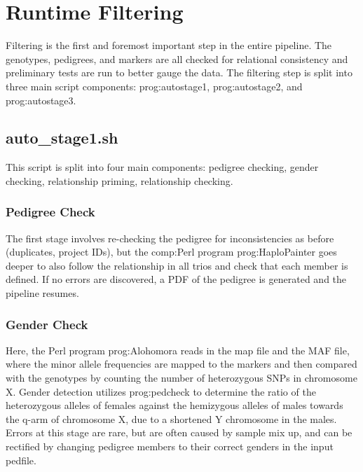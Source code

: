 \section{Runtime Filtering}

Filtering is the first and foremost important step in the entire pipeline. The genotypes, pedigrees, and markers are all checked for relational consistency and preliminary tests are run to better gauge the data. The filtering step is split into three main script components: \gls{prog:autostage1}, \gls{prog:autostage2}, and \gls{prog:autostage3}.

\subsection{auto\_stage1.sh}

This script is split into four main components: pedigree checking, gender checking, relationship priming, relationship checking.

\subsubsection{Pedigree Check}

The first stage involves re-checking the pedigree for inconsistencies as before (duplicates, project IDs), but the \gls{comp:Perl} program \gls{prog:HaploPainter} goes deeper to also follow the relationship in all trios and check that each member is defined. If no errors are discovered, a PDF of the pedigree is generated and the pipeline resumes.

\subsubsection{Gender Check}

Here, the Perl program \gls{prog:Alohomora} reads in the map file and the MAF file, where the minor allele frequencies are mapped to the markers and then compared with the genotypes by counting the number of heterozygous SNPs in chromosome X\citep{ruschendorf2005alohomora}. Gender detection utilizes \gls{prog:pedcheck} to determine the ratio of the heterozygous alleles of females against the hemizygous alleles of males towards the q-arm of chromosome X, due to a shortened Y chromosome in the males\citep{o1998pedcheck}. Errors at this stage are rare, but are often caused by sample mix up, and can be rectified by changing pedigree members to their correct genders in the input pedfile.

